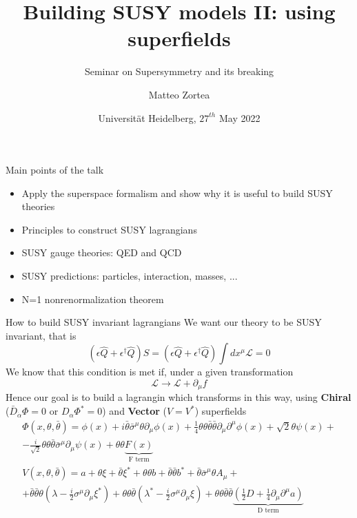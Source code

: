 \documentclass[10pt]{beamer}
\title{Building SUSY models II: using superfields}
\subtitle{Seminar on Supersymmetry and its breaking}
\author{Matteo Zortea}
\date{Universit\"at Heidelberg, $27^{th}$ May 2022}
\institute{Coordinated by prof. J\"org J\"ackel}
\begin{document}
\begin{frame}
\titlepage
\end{frame}

\begin{frame}{Main points of the talk}
\begin{itemize}
    \item Apply the superspace formalism and show why it is useful to build SUSY theories
    \item Principles to construct SUSY lagrangians 
    \item SUSY gauge theories: QED and QCD
    \item SUSY predictions: particles, interaction, masses, ...
    \item N=1 nonrenormalization theorem
\end{itemize}
\end{frame}

\begin{frame}{How to build SUSY invariant lagrangians}
    We want our theory to be SUSY invariant, that is
    \begin{equation*}
        \left(\epsilon \hat Q + \epsilon^\dagger \hat Q\right) S = \left(\epsilon \hat Q + \epsilon^\dagger \hat Q\right) \int dx^\mu \mathcal{L} = 0
    \end{equation*}
    We know that this condition is met if, under a given transformation
    \begin{equation*}
        \mathcal{L} \to \mathcal{L} + \partial_\mu f
    \end{equation*}
    Hence our goal is to build a lagrangin which transforms in this way, using \textbf{Chiral} ($\bar D_{\dot\alpha} \Phi = 0$ or $D_{\alpha}\Phi^* = 0$) and \textbf{Vector} ($V=V^*$) superfields
\begin{gather*}
    \Phi(x, \theta, \bar\theta) = \phi(x) + i\bar\theta \bar\sigma^{\mu}\theta \partial_{\mu}\phi(x) + \frac{1}{4}\theta\theta\bar\theta\bar\theta\partial_{\mu}\partial^{\mu}\phi(x) + \sqrt{2}\theta\psi(x) + \\ 
    -\frac{i}{\sqrt{2}}\theta\theta\bar\theta\bar\sigma^{\mu}\partial_{\mu}\psi(x) + \theta\theta \underbrace{F(x)}_{\text{F term}} \\
    V\left(x, \theta, \bar\theta\right) = a+\theta \xi+\bar\theta \xi^* +\theta \theta b+\bar\theta \bar\theta b^{*}+\bar\theta \bar{\sigma}^{\mu} \theta A_{\mu}+ \\ 
    + \bar\theta \bar\theta \theta\left(\lambda-\frac{i}{2} \sigma^{\mu} \partial_{\mu} \xi^*\right)
    +\theta \theta \bar\theta\left(\lambda^*-\frac{i}{2} \sigma^{\mu} \partial_{\mu} \xi\right)+\theta \theta \bar\theta \bar\theta \underbrace{\left(\frac{1}{2} D+\frac{1}{4} \partial_{\mu} \partial^{\mu} a\right)}_{\text{D term}}
\end{gather*}
\end{frame}
\end{document}
